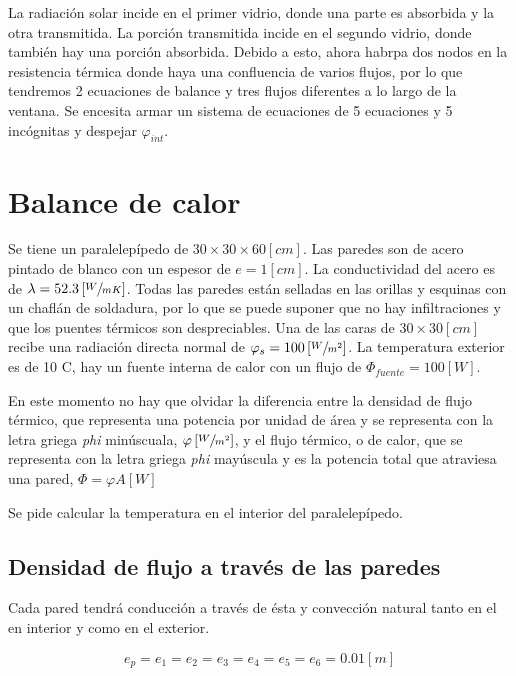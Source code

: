 \documentclass[11pt]{article}
\begin{document}
La radiación solar incide en el primer vidrio, donde una parte es absorbida y la otra transmitida. La porción transmitida incide en el segundo vidrio, donde también hay una porción absorbida. Debido a esto, ahora habrpa dos nodos en la resistencia térmica donde haya una confluencia de varios flujos, por lo que tendremos 2 ecuaciones de balance y tres flujos diferentes a lo largo de la ventana. Se encesita armar un sistema de ecuaciones de 5 ecuaciones y 5 incógnitas y despejar $ \varphi _{ int } $.


\section{Balance de calor}

Se tiene un paralelepípedo de $ 30 \times 30 \times 60 \left[ cm \right] $. Las paredes son de acero pintado de blanco con un espesor de $ e = 1 \left[ cm \right] $. La conductividad del acero es de $ \lambda = 52.3 \left[ \sfrac{ W }{ m K } \right] $. Todas las paredes están selladas en las orillas y esquinas con un chaflán de soldadura, por lo que se puede suponer que no hay infiltraciones y que los puentes térmicos son despreciables. Una de las caras de $ 30 \times 30 \left[ cm \right] $ recibe una radiación directa normal de $ \varphi _s = 100 \left[ \sfrac{ W }{ m ^2 } \right] $. La temperatura exterior es de 10 \degree C, hay un fuente interna de calor con un flujo de $ \Phi _{ fuente } = 100 \left[ W \right] $.

En este momento no hay que olvidar la diferencia entre la densidad de flujo térmico, que representa una potencia por unidad de área y se representa con la letra griega \emph{phi} minúscuala, $ \varphi \left[ \sfrac{ W }{ m ^2 } \right] $, y el flujo térmico, o de calor, que se representa con la letra griega \emph{phi} mayúscula y es la potencia total que atraviesa una pared, $ \Phi = \varphi A \left[ W \right] $

Se pide calcular la temperatura en el interior del paralelepípedo.

\subsection{Densidad de flujo a través de las paredes}

Cada pared tendrá conducción a través de ésta y convección natural tanto en el en interior y como en el exterior.

\[ e_p = e_1 = e_2 = e_3 = e_4 = e_5 = e_6 = 0.01 \left[ m \right] \]
\end{document}
